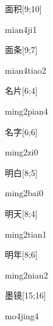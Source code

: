 \begin{verbete}[mian4ji1]{面积}[9;10]
\begin{pronuncia}{mian4ji1}
\end{pronuncia}
\end{verbete}

\begin{verbete}{面条}[9;7]
\begin{pronuncia}{mian4tiao2}
\end{pronuncia}
\end{verbete}

\begin{verbete}{名片}[6;4]
\begin{pronuncia}{ming2pian4}
\end{pronuncia}
\end{verbete}

\begin{verbete}[ming2zi0]{名字}[6;6]
\begin{pronuncia}{ming2zi0}
\end{pronuncia}
\end{verbete}

\begin{verbete}{明白}[8;5]
\begin{pronuncia}{ming2bai0}
\end{pronuncia}
\end{verbete}

\begin{verbete}{明天}[8;4]
\begin{pronuncia}{ming2tian1}
\end{pronuncia}
\end{verbete}

\begin{verbete}{明年}[8;6]
\begin{pronuncia}{ming2nian2}
\end{pronuncia}
\end{verbete}

\begin{verbete}[mo4jing4]{墨镜}[15;16]
\begin{pronuncia}{mo4jing4}
\end{pronuncia}
\end{verbete}


